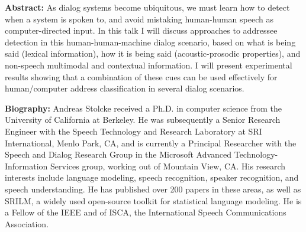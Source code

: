 \noindent \textbf{Abstract:} 
 As dialog systems become ubiquitous, we must learn how to detect when a system is spoken to, and avoid mistaking human-human speech as computer-directed input. In this talk I will discuss approaches to addressee detection in this human-human-machine dialog scenario, based on what is being said (lexical information), how it is being said (acoustic-prosodic properties), and non-speech multimodal and contextual information. I will present experimental results showing that a combination of these cues can be used effectively for human/computer address classification in several dialog scenarios. 

\vspace{3em}

\vfill{}
\noindent \textbf{Biography:}  
 Andreas Stolcke received a Ph.D. in computer science from the University of California at Berkeley. He was subsequently a Senior Research Engineer with the Speech Technology and Research Laboratory at SRI International, Menlo Park, CA, and is currently a Principal Researcher with the Speech and Dialog Research Group in the Microsoft Advanced Technology-Information Services group, working out of Mountain View, CA. His research interests include language modeling, speech recognition, speaker recognition, and speech understanding. He has published over 200 papers in these areas, as well as SRILM, a widely used open-source toolkit for statistical language modeling. He is a Fellow of the IEEE and of ISCA, the International Speech Communications Association. 
\clearpage{}







